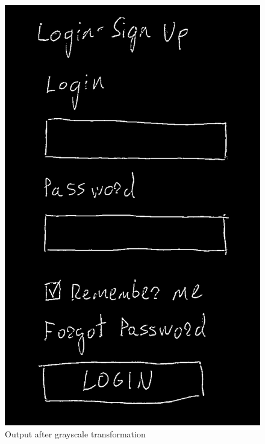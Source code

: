         \begin{figure}[H]
      		\centering
      		\includegraphics[width=6in]{grayscale.jpg}
      		\caption
      		{Output after grayscale transformation}
      	\end{figure}

